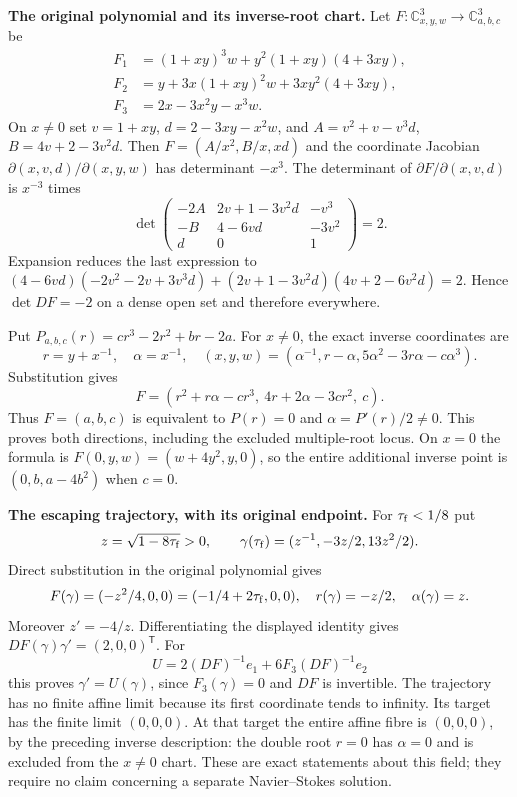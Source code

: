 \documentclass[11pt,a4paper]{article}
\theoremstyle{definition}\newtheorem{definition}[theorem]{Definition}
\begin{document}
\EH\textbf{The original polynomial and its inverse-root chart.}
Let $F:\mathbb C^3_{x,y,w}\to\mathbb C^3_{a,b,c}$ be
\begin{align*}
 F_1&=(1+xy)^3w+y^2(1+xy)(4+3xy),\\
 F_2&=y+3x(1+xy)^2w+3xy^2(4+3xy),\\
 F_3&=2x-3x^2y-x^3w.
\end{align*}
On $x\ne0$ set $v=1+xy$, $d=2-3xy-x^2w$, and
$A=v^2+v-v^3d$, $B=4v+2-3v^2d$. Then
$F=(A/x^2,B/x,xd)$ and the coordinate Jacobian
$\partial(x,v,d)/\partial(x,y,w)$ has determinant $-x^3$.
The determinant of $\partial F/\partial(x,v,d)$ is $x^{-3}$ times
\[
\det\begin{pmatrix}-2A&2v+1-3v^2d&-v^3\\
-B&4-6vd&-3v^2\\d&0&1\end{pmatrix}=2.
\]
Expansion reduces the last expression to
$(4-6vd)(-2v^2-2v+3v^3d)+(2v+1-3v^2d)(4v+2-6v^2d)=2$.
Hence $\det DF=-2$ on a dense open set and therefore everywhere.

Put $P_{a,b,c}(r)=cr^3-2r^2+br-2a$. For $x\ne0$, the exact inverse
coordinates are
\[
 r=y+x^{-1},\quad \alpha=x^{-1},\quad
 (x,y,w)=(\alpha^{-1},r-\alpha,5\alpha^2-3r\alpha-c\alpha^3).
\]
Substitution gives
\[
F=(r^2+r\alpha-cr^3,\ 4r+2\alpha-3cr^2,\ c).
\]
Thus $F=(a,b,c)$ is equivalent to $P(r)=0$ and
$\alpha=P'(r)/2\ne0$. This proves both directions, including the
excluded multiple-root locus. On $x=0$ the formula is
$F(0,y,w)=(w+4y^2,y,0)$, so the entire additional inverse point is
$(0,b,a-4b^2)$ when $c=0$.

\EH\textbf{The escaping trajectory, with its original endpoint.}
For $\tau_{\rm f}<1/8$ put
\[
 z=\sqrt{1-8\tau_{\rm f}}>0,\qquad
 \gamma(\tau_{\rm f})=(z^{-1},-3z/2,13z^2/2).
\]
Direct substitution in the original polynomial gives
\[
 F(\gamma)=(-z^2/4,0,0)=(-1/4+2\tau_{\rm f},0,0),\quad
 r(\gamma)=-z/2,\quad \alpha(\gamma)=z.
\]
Moreover $z'=-4/z$. Differentiating the displayed identity gives
$DF(\gamma)\gamma'=(2,0,0)^{\mathsf T}$. For
\[
 U=2(DF)^{-1}e_1+6F_3(DF)^{-1}e_2
\]
this proves $\gamma'=U(\gamma)$, since $F_3(\gamma)=0$ and $DF$ is
invertible. The trajectory has no finite affine limit because its first
coordinate tends to infinity. Its target has the finite limit $(0,0,0)$.
At that target the entire affine fibre is $(0,0,0)$, by the preceding
inverse description: the double root $r=0$ has $\alpha=0$ and is excluded
from the $x\ne0$ chart. These are exact statements about this field;
they require no claim concerning a separate Navier--Stokes solution.
\end{document}
